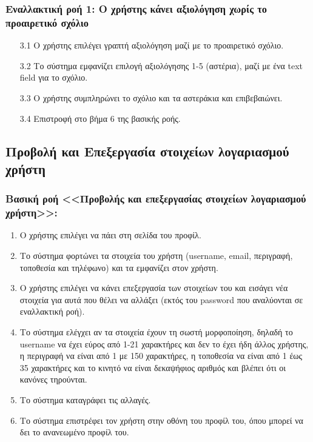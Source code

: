 \documentclass[12pt,a4paper]{article}
\begin{document}
\subsubsection*{Εναλλακτική ροή 1: Ο χρήστης κάνει αξιολόγηση χωρίς το προαιρετικό σχόλιο}
\begin{enumerate}
    \item[3.1] Ο χρήστης επιλέγει γραπτή αξιολόγηση μαζί με το προαιρετικό σχόλιο. 
    \item[3.2] Το σύστημα εμφανίζει επιλογή αξιολόγησης 1-5 (αστέρια), μαζί με ένα text field για το σχόλιο. 
    \item[3.3] Ο χρήστης συμπληρώνει το σχόλιο και τα αστεράκια και επιβεβαιώνει.
    \item[3.4] Επιστροφή στο βήμα 6 της βασικής ροής.
\end{enumerate}

\subsection{Προβολή και Επεξεργασία στοιχείων λογαριασμού χρήστη}

\subsubsection*{Βασική ροή <<Προβολής και επεξεργασίας στοιχείων λογαριασμού \\χρήστη>>:}
\begin{enumerate}
    \item Ο χρήστης επιλέγει να πάει στη σελίδα του προφίλ. 
    \item Το σύστημα φορτώνει τα στοιχεία του χρήστη (username, email, περιγραφή, τοποθεσία και τηλέφωνο) και τα εμφανίζει στον χρήστη.
    \item Ο χρήστης επιλέγει να κάνει επεξεργασία των στοιχείων του και εισάγει νέα στοιχεία για αυτά που θέλει να αλλάξει (εκτός του password που αναλύονται σε εναλλακτική ροή). 
    \item Το σύστημα ελέγχει αν τα στοιχεία έχουν τη σωστή μορφοποίηση, δηλαδή το username να έχει εύρος από 1-21 χαρακτήρες και δεν το έχει ήδη άλλος χρήστης, η περιγραφή να είναι από 1 με 150 χαρακτήρες, η τοποθεσία να είναι από 1 έως 35 χαρακτήρες και το κινητό να είναι δεκαψήφιος αριθμός και βλέπει ότι οι κανόνες τηρούνται.
    \item Το σύστημα καταγράφει τις αλλαγές.
    \item Το σύστημα επιστρέφει τον χρήστη στην οθόνη του προφίλ του, όπου μπορεί να δει το ανανεωμένο προφίλ του.
\end{enumerate}
\end{document}

